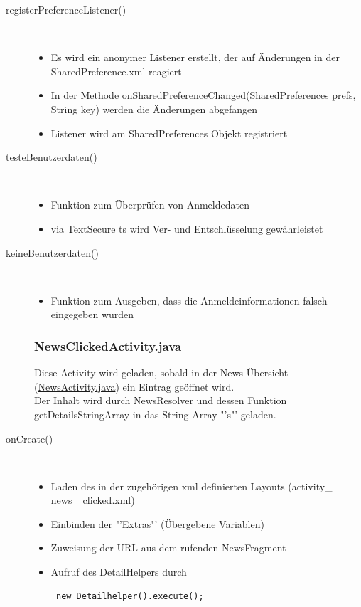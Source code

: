 \begin{description}
\item[registerPreferenceListener()]~\par
\begin{itemize}
\item Es wird ein anonymer Listener erstellt, der auf Änderungen in der SharedPreference.xml reagiert
\item In der Methode onSharedPreferenceChanged(SharedPreferences prefs, String key) werden die Änderungen abgefangen
\item Listener wird am SharedPreferences Objekt  registriert
\end{itemize}

\item[testeBenutzerdaten()]~\par
\begin{itemize}
\item Funktion zum Überprüfen von Anmeldedaten
\item via TextSecure ts wird Ver- und Entschlüsselung gewährleistet
\end{itemize}


 
\item[keineBenutzerdaten()]~\par
\begin{itemize}
\item Funktion zum Ausgeben, dass die Anmeldeinformationen falsch eingegeben wurden
\end{itemize}

\newpage

\subsubsection{NewsClickedActivity.java}
\label{NewsClickedActivity}
\lstset{language=JAVA}
Diese Activity wird geladen, sobald in der News-Übersicht (\hyperref[newsactitvity]{NewsActivity.java}) ein Eintrag geöffnet wird. \\
Der Inhalt wird durch NewsResolver und dessen Funktion getDetailsStringArray in das String-Array "'s"' geladen.
\item[onCreate()]~\par
\begin{itemize}
\item Laden des in der zugehörigen xml definierten Layouts (activity\_ news\_ clicked.xml)
\item Einbinden der "'Extras"' (Übergebene Variablen)
\item Zuweisung der URL aus dem rufenden NewsFragment
\item Aufruf des DetailHelpers durch 
\begin{lstlisting}
 new Detailhelper().execute();
\end{lstlisting}
\end{itemize}


\end{description}
